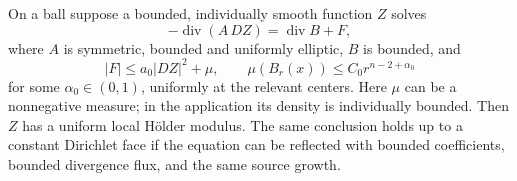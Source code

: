 \begin{lemma}
\label{pde:natural-growth}
On a ball suppose a bounded, individually smooth function \(Z\) solves
\[
 -\operatorname{div}(A\,DZ)=\operatorname{div}B+F,
\]
where \(A\) is symmetric, bounded and uniformly elliptic, \(B\) is
bounded, and
\[
 |F|\le a_0|DZ|^2+\mu,\qquad
 \mu(B_r(x))\le C_0 r^{n-2+\alpha_0}
\]
for some \(\alpha_0\in(0,1)\), uniformly at the relevant centers.
Here \(\mu\) can be a nonnegative measure; in the application its
density is individually bounded.  Then \(Z\) has a uniform local
H\"older modulus.  The same conclusion holds up to a constant
Dirichlet face if the equation can be reflected with bounded
coefficients, bounded divergence flux, and the same source growth.
\end{lemma}

